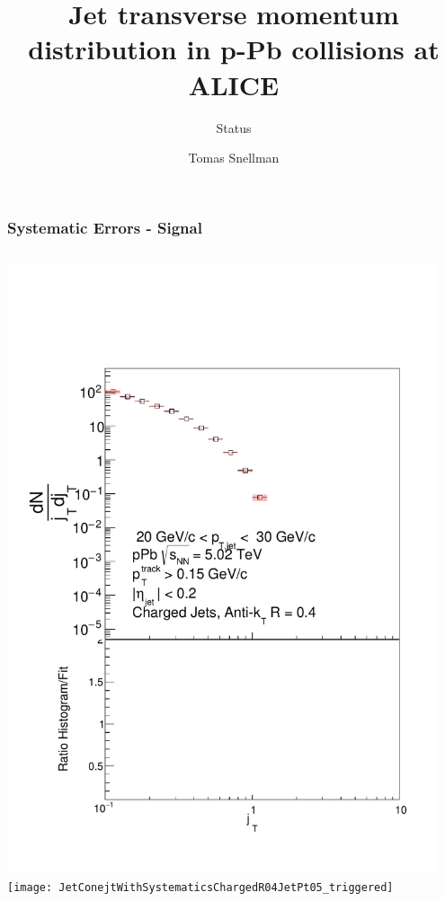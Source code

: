 \documentclass{beamer}
\title[Jet $j_{T}$]{Jet transverse momentum distribution in p-Pb collisions at ALICE}
\subtitle{Status}
\author{Tomas Snellman} %
\institute{University of Jyvaskyla}%
\begin{document}
\titlepage

\begin{frame}
\frametitle{Systematic Errors - Signal}
\begin{columns}
\includegraphics[width=0.95\textwidth]{JetConejtWithSystematicsChargedR04JetPt02_triggered} \\
\texttt{[image: JetConejtWithSystematicsChargedR04JetPt05\_triggered]} \\

\end{columns}
\end{frame}
\end{document}
